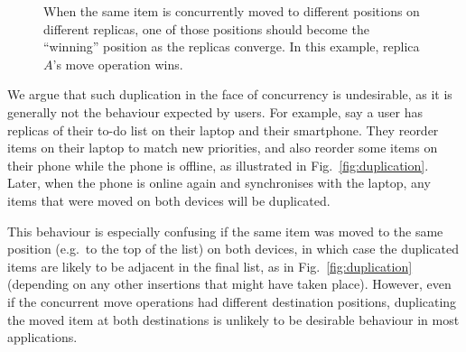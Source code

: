 \documentclass[sigplan,10pt]{acmart}
\begin{document}
\begin{figure}
    \caption{When the same item is concurrently moved to different positions on different replicas, one of those positions should become the ``winning'' position as the replicas converge. In this example, replica $A$'s move operation wins.}
    \label{fig:concurrent}
\end{figure}

We argue that such duplication in the face of concurrency is undesirable, as it is generally not the behaviour expected by users.
For example, say a user has replicas of their to-do list on their laptop and their smartphone.
They reorder items on their laptop to match new priorities, and also reorder some items on their phone while the phone is offline, as illustrated in Fig.~\ref{fig:duplication}.
Later, when the phone is online again and synchronises with the laptop, any items that were moved on both devices will be duplicated.

This behaviour is especially confusing if the same item was moved to the same position (e.g.\ to the top of the list) on both devices, in which case the duplicated items are likely to be adjacent in the final list, as in Fig.~\ref{fig:duplication} (depending on any other insertions that might have taken place).
However, even if the concurrent move operations had different destination positions, duplicating the moved item at both destinations is unlikely to be desirable behaviour in most applications.
\end{document}
